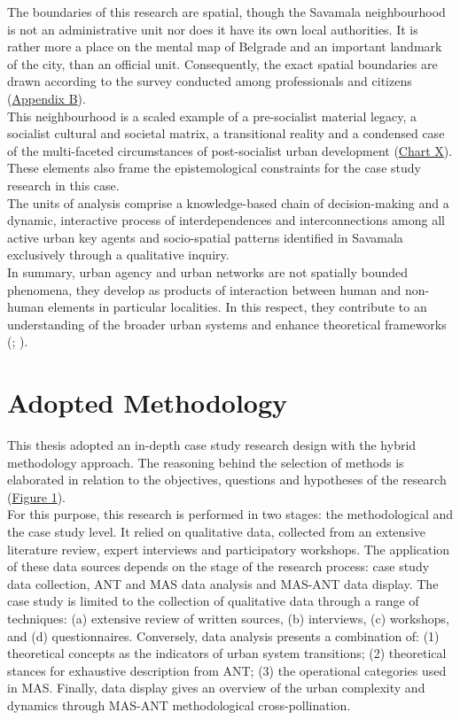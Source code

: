 \documentclass[11pt]{report}
\begin{document}
{{{{The boundaries of this research are spatial, though the Savamala neighbourhood is not an administrative unit nor does it have its own local authorities. It is rather more a place on the mental map of Belgrade and an important landmark of the city, than an official unit. Consequently, the exact spatial boundaries are drawn according to the survey conducted among professionals and citizens (\href{Appendix}{Appendix B}).
\\

This neighbourhood is a scaled example of a pre-socialist material legacy, a socialist cultural and societal matrix, a transitional reality and a condensed case of the multi-faceted circumstances of post-socialist urban development (\href{Table space-time}{Chart X}). These elements also frame the epistemological constraints for the case study research in this case.
\\

The units of analysis comprise a knowledge-based chain of decision-making and a dynamic, interactive process of interdependences and interconnections among all active urban key agents and socio-spatial patterns identified in Savamala exclusively through a qualitative inquiry.
\\

In summary, urban agency and urban networks are not spatially bounded phenomena, they develop as products of interaction between human and non-human elements in particular localities. In this respect, they contribute to an understanding of the broader urban systems and enhance theoretical frameworks (\href{Giddens}{\citealt{giddens_constitution_1984}}; \href{Grubovic}{\citealt{grubovic_belgrade_2006}}).

\section{Adopted Methodology}

This thesis adopted an in-depth case study research design with the hybrid methodology approach. The reasoning behind the selection of methods is elaborated in relation to the objectives, questions and hypotheses of the research (\href{ref}{Figure 1}).  
\\

For this purpose, this research is performed in two stages: the methodological and the case study level. It relied on qualitative data, collected from an extensive literature review, expert interviews and participatory workshops. The application of these data sources depends on the stage of the research process: case study data collection, ANT and MAS data analysis and MAS-ANT data display. The case study is limited to the collection of qualitative data through a range of techniques:  (a) extensive review of written sources, (b) interviews,
(c) workshops, and (d) questionnaires. Conversely, data analysis presents a combination of: (1) theoretical concepts as the indicators of urban system transitions; (2) theoretical stances for exhaustive description from ANT; (3) the operational categories used in MAS. Finally, data display gives an overview of the urban complexity and dynamics through MAS-ANT methodological cross-pollination.
\\

}}}}
\end{document}
